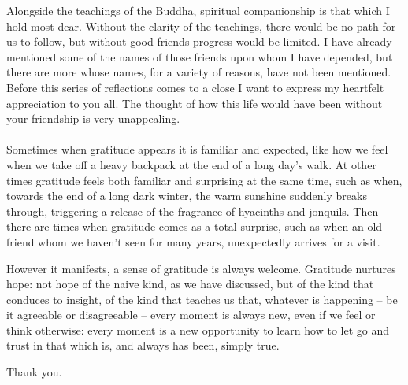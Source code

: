 Alongside the teachings of the Buddha, spiritual companionship is that
which I hold most dear. Without the clarity of the teachings, there
would be no path for us to follow, but without good friends progress
would be limited. I have already mentioned some of the names of those
friends upon whom I have depended, but there are more whose names, for a
variety of reasons, have not been mentioned. Before this series of
reflections comes to a close I want to express my heartfelt appreciation
to you all. The thought of how this life would have been without your
friendship is very unappealing.\\
~\\
Sometimes when gratitude appears it is familiar and expected, like how
we feel when we take off a heavy backpack at the end of a long day's
walk. At other times gratitude feels both familiar and surprising at the
same time, such as when, towards the end of a long dark winter, the warm
sunshine suddenly breaks through, triggering a release of the fragrance
of hyacinths and jonquils. Then there are times when gratitude comes as
a total surprise, such as when an old friend whom we haven't seen for
many years, unexpectedly arrives for a visit.

However it manifests, a sense of gratitude is always welcome. Gratitude
nurtures hope: not hope of the naive kind, as we have discussed, but of
the kind that conduces to insight, of the kind that teaches us that,
whatever is happening -- be it agreeable or disagreeable -- every moment
is always new, even if we feel or think otherwise: every moment is a new
opportunity to learn how to let go and trust in that which is, and
always has been, simply true.

Thank you.

